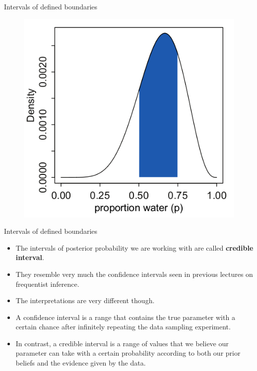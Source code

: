 \documentclass[handout]{beamer}
\begin{document}
\begin{frame}{Intervals of defined boundaries}
\scriptsize{

   \begin{figure}[h!]
	\centering
	\includegraphics[scale=0.45]{pics/interval2.png}
	\end{figure} 




} 

\end{frame}


\begin{frame}[fragile]{Intervals of defined boundaries}
\scriptsize{
\begin{itemize}

\item The intervals of posterior probability we are working with are called \textbf{credible interval}.

\item They resemble very much the confidence intervals seen in previous lectures on frequentist inference.

\item The interpretations are very different though.

\item A confidence interval is a range that contains the true parameter with a certain chance after infinitely repeating the data sampling experiment.

\item In contrast, a credible interval is a range of values that we believe our parameter can take with a certain probability according to both our prior beliefs and the evidence given by the data.

\end{itemize}



} 

\end{frame}
\end{document}
